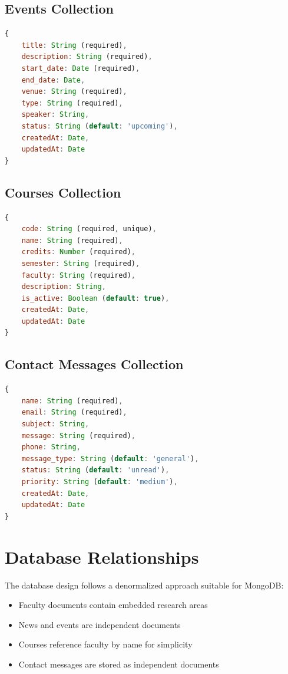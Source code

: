 \documentclass[12pt,a4paper]{report}
\begin{document}
\subsection{Events Collection}
\begin{lstlisting}[language=JavaScript, caption=Events Schema]
{
    title: String (required),
    description: String (required),
    start_date: Date (required),
    end_date: Date,
    venue: String (required),
    type: String (required),
    speaker: String,
    status: String (default: 'upcoming'),
    createdAt: Date,
    updatedAt: Date
}
\end{lstlisting}

\subsection{Courses Collection}
\begin{lstlisting}[language=JavaScript, caption=Courses Schema]
{
    code: String (required, unique),
    name: String (required),
    credits: Number (required),
    semester: String (required),
    faculty: String (required),
    description: String,
    is_active: Boolean (default: true),
    createdAt: Date,
    updatedAt: Date
}
\end{lstlisting}

\subsection{Contact Messages Collection}
\begin{lstlisting}[language=JavaScript, caption=Contact Messages Schema]
{
    name: String (required),
    email: String (required),
    subject: String,
    message: String (required),
    phone: String,
    message_type: String (default: 'general'),
    status: String (default: 'unread'),
    priority: String (default: 'medium'),
    createdAt: Date,
    updatedAt: Date
}
\end{lstlisting}

\section{Database Relationships}
The database design follows a denormalized approach suitable for MongoDB:
\begin{itemize}
    \item Faculty documents contain embedded research areas
    \item News and events are independent documents
    \item Courses reference faculty by name for simplicity
    \item Contact messages are stored as independent documents
\end{itemize}
\end{document}
